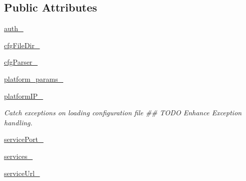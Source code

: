 \subsection*{Public Attributes}
\begin{DoxyCompactItemize}
\item 
\hyperlink{classRappCloud_1_1RappCloud_1_1RappCloud_a25b6e93981b99843ada1073abc2725d6}{auth\-\_\-}
\item 
\hyperlink{classRappCloud_1_1RappCloud_1_1RappCloud_a72701504206c4cf9ba7648061c024bf6}{cfg\-File\-Dir\-\_\-}
\item 
\hyperlink{classRappCloud_1_1RappCloud_1_1RappCloud_a2f9a4dc57603f431e1253e3b3e875b2e}{cfg\-Parser\-\_\-}
\item 
\hyperlink{classRappCloud_1_1RappCloud_1_1RappCloud_a2b520886fb7ab3eebfab76aeb34cef97}{platform\-\_\-params\-\_\-}
\item 
\hyperlink{classRappCloud_1_1RappCloud_1_1RappCloud_ae942be1659a3c338b5488fbc55c79ad0}{platform\-I\-P\-\_\-}
\begin{DoxyCompactList}\small\item\em Catch exceptions on loading configuration file \#\# T\-O\-D\-O Enhance Exception handling. \end{DoxyCompactList}\item 
\hyperlink{classRappCloud_1_1RappCloud_1_1RappCloud_a29102a58a5aaf453f7cb05901cb424c4}{service\-Port\-\_\-}
\item 
\hyperlink{classRappCloud_1_1RappCloud_1_1RappCloud_a342b68e2b06009953fe2ba715242f167}{services\-\_\-}
\item 
\hyperlink{classRappCloud_1_1RappCloud_1_1RappCloud_a69edf9cbb678486d4b4f02d4f4dee62e}{service\-Url\-\_\-}
\end{DoxyCompactItemize}
